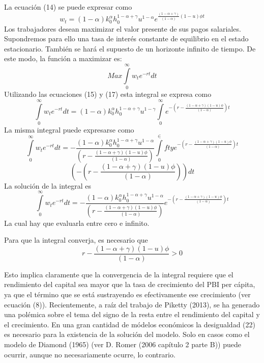 \documentclass[12pt,a4paper]{report}
\newcommand{\icis}{{\textstyle\int\limits_0^\infty}w_te^{-rt}dt}
\newcommand{\suma}{(1-\alpha + \gamma)}
\newcommand{\fphi}{\frac{\suma (1-u)\phi}{(1-\alpha)}}
\begin{document}
	La ecuación (14) se puede expresar como
	\begin{equation}\label{ecu17}
		w_t=(1-\alpha)k_0^\alpha h_0^{1-\alpha +\gamma}u^{1-\alpha}e^{\frac{(1-\alpha + \gamma)}{(1-\alpha)}(1-u)\phi t}
	\end{equation} 
	Los trabajadores desean maximizar el valor presente de sus pagos salariales.\\
	Supondremos para ello una tasa de interés constante de equilibrio en el estado estacionario. También se hará el supuesto de un horizonte infinito de tiempo.
	De este modo, la función a maximizar es:
	\begin{equation}\label{ecu18}
		Max\icis
	\end{equation}
	Utilizando las ecuaciones (15) y (17) esta integral se expresa como 
	\begin{equation}\label{ecu19}
		\icis =(1-\alpha)k_0^\alpha h_0^{1-\alpha + \gamma} u^{1-\gamma}\int\limits_0^\infty e^{-(r-\fphi)t}
	\end{equation}
	La misma integral puede expresarse como
	\begin{equation}\label{ecu20}
		\icis=-\frac{(1-\alpha)k_0^\alpha h_0^{1-\alpha + \gamma}u^{1-\alpha}}{(r-\fphi)}\int\limits_0^\in
		fty e^{-(r-\fphi)t}
	\end{equation}
	$$(-(r-\fphi))dt$$
	La solución de la integral es
	\begin{equation}\label{ecu21}
		\icis =-\frac{(1-\alpha)k_0^\alpha h_0^{1-\alpha + \gamma} u^{1-\alpha}}{(r-\fphi)} e^{-(r-\fphi)t}
	\end{equation}
	La cual hay que evaluarla entre cero e infinito.
	
	Para que la integral converja, es necesario que
	\begin{equation}\label{ecu22}
		r-\fphi >0
	\end{equation}
	
	Esto implica claramente que la convergencia de la integral requiere que el rendimiento del capital sea mayor que la tasa de crecimiento del PBI per cápita, ya que el término que se está sustrayendo es efectivamente ese crecimiento (ver ecuación (8)). Recientemente, a raíz del trabajo de Piketty (2013), se ha generado una polémica sobre el tema del signo de la resta entre el rendimiento del capital y el crecimiento. En una gran cantidad de módelos económicos la desigualdad (22) es necesario para la existencia de la solución del modelo. Solo en casos como el modelo de Diamond (1965) (ver D. Romer (2006 capítulo 2 parte B)) puede ocurrir, aunque no necesariamente ocurre, lo contrario.
	
\end{document}
